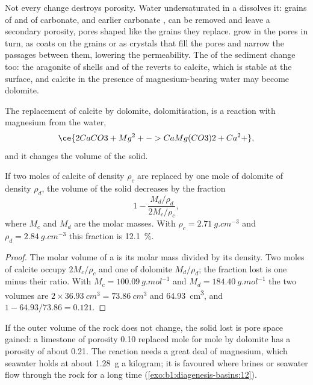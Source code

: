 Not every change destroys porosity. Water undersaturated in a  dissolves
it: grains of  and of carbonate, and earlier carbonate , can be
removed and leave a secondary porosity, pores shaped like the grains they
replace.  grow in the pores in turn, as coats on the grains or as
crystals that fill the pores and narrow the passages between them, lowering the
permeability. The  of the sediment change too: the
aragonite of shells and of the  reverts to calcite, which is
stable at the surface, and calcite in the presence of magnesium-bearing water
may become dolomite.

The replacement of calcite by dolomite, dolomitisation, is a reaction with
magnesium from the water,
\[
  \ce{2 CaCO3 + Mg^2+ -> CaMg(CO3)2 + Ca^2+},
\]
and it changes the volume of the solid.

\begin{proposition}\label{prop:b1:diagenesis-basins:dolomite}
If two moles of calcite of density $\rho_c$ are replaced by one mole of dolomite
of density $\rho_d$, the volume of the solid decreases by the fraction
\[
  1 - \frac{M_d/\rho_d}{2M_c/\rho_c},
\]
where $M_c$ and $M_d$ are the molar masses. With $\rho_c = \qty{2.71}{g.cm^{-3}}$
and $\rho_d = \qty{2.84}{g.cm^{-3}}$ this fraction is \qty{12.1}{\percent}.
\end{proposition}

\begin{proof}
The molar volume of a  is its molar mass divided by its density. Two
moles of calcite occupy $2M_c/\rho_c$ and one of dolomite $M_d/\rho_d$; the
fraction lost is one minus their ratio. With $M_c = \qty{100.09}{g.mol^{-1}}$
and $M_d = \qty{184.40}{g.mol^{-1}}$ the two volumes are
$2\times\qty{36.93}{cm^3} = \qty{73.86}{cm^3}$ and \qty{64.93}{cm^3}, and
$1 - 64.93/73.86 = \num{0.121}$.
\end{proof}

If the outer volume of the rock does not change, the solid lost is pore space
gained: a limestone of porosity \num{0.10} replaced mole for mole by dolomite has
a porosity of about \num{0.21}. The reaction needs a great deal of magnesium,
which seawater holds at about \qty{1.28}{g} a kilogram; it is favoured where
brines or seawater flow through the rock for a long time
(\cref{exo:b1:diagenesis-basins:12}).

